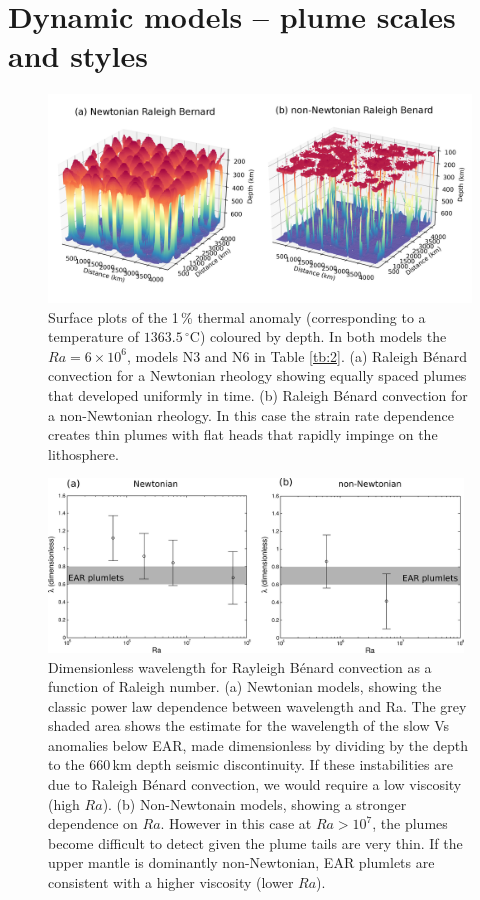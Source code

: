 \documentclass[a4paper,10pt,twocolumn]{paper}
\begin{document}
\section{Dynamic models – plume scales and styles}

\begin{figure}
\centering
\includegraphics[width=16cm]{../figures-working/comparison.png}
\caption{Surface plots of the 1\,\% thermal anomaly (corresponding to a temperature of $1363.5\,^{\circ}$C) coloured by depth. In both models the $Ra = 6\times10^{6}$, models N3 and N6 in Table \ref{tb:2}. (a) Raleigh B{\'e}nard convection for a Newtonian rheology showing equally spaced plumes that developed uniformly in time. (b) Raleigh B{\'e}nard convection for a non-Newtonian rheology. In this case the strain rate dependence creates thin plumes with flat heads that rapidly impinge on the lithosphere.}
\label{fg:2}
\end{figure}

\begin{figure}
\centering
\includegraphics[width=11cm]{../figures-working/wavelengths.png}
\caption{Dimensionless wavelength for Rayleigh B{\'e}nard convection as a function of Raleigh number. (a) Newtonian models, showing the classic power law dependence between wavelength and Ra. The grey shaded area shows the estimate for the wavelength of the slow Vs anomalies below EAR, made dimensionless by dividing by the depth to the 660\,km depth seismic discontinuity. If these instabilities are due to Raleigh B{\'e}nard convection, we would require a low viscosity (high $Ra$). (b) Non-Newtonain models, showing a stronger dependence on $Ra$. However in this case at $Ra>10^7$, the plumes become difficult to detect given the plume tails are very thin. If the upper mantle is dominantly non-Newtonian, EAR plumlets are consistent with a higher viscosity (lower $Ra$).}
\label{fg:3}
\end{figure}
\end{document}
